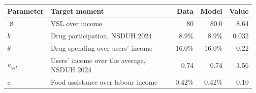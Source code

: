 \footnotesize
\begin{tabular}{@{}llrrr@{}}
\toprule
Parameter & Target moment & Data & Model & Value \\
\midrule
$\aleph$ & VSL over income & 80 & 80.0 & 8.64 \\
$b$ & Drug participation, NSDUH 2024 & 8.9\% & 8.9\% & 0.032 \\
$\theta$ & Drug spending over users' income & 16.0\% & 16.0\% & 0.22 \\
$\kappa_{\phi d}$ & Users' income over the average, NSDUH 2024 & 0.74 & 0.74 & 3.56 \\
$\underline c$ & Food assistance over labour income & 0.42\% & 0.42\% & 0.10 \\
\bottomrule
\end{tabular}
